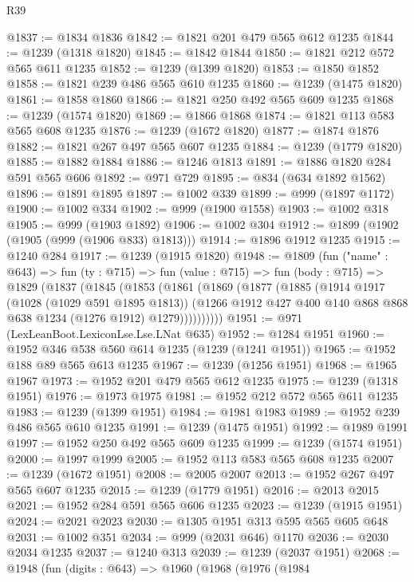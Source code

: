 \begin{lexlean}{R39}
\begin{coremodule}
@1837 := @1834 @1836
@1842 := @1821 @201 @479 @565 @612 @1235
@1844 := @1239 (@1318 @1820)
@1845 := @1842 @1844
@1850 := @1821 @212 @572 @565 @611 @1235
@1852 := @1239 (@1399 @1820)
@1853 := @1850 @1852
@1858 := @1821 @239 @486 @565 @610 @1235
@1860 := @1239 (@1475 @1820)
@1861 := @1858 @1860
@1866 := @1821 @250 @492 @565 @609 @1235
@1868 := @1239 (@1574 @1820)
@1869 := @1866 @1868
@1874 := @1821 @113 @583 @565 @608 @1235
@1876 := @1239 (@1672 @1820)
@1877 := @1874 @1876
@1882 := @1821 @267 @497 @565 @607 @1235
@1884 := @1239 (@1779 @1820)
@1885 := @1882 @1884
@1886 := @1246 @1813
@1891 := @1886 @1820 @284 @591 @565 @606
@1892 := @971 @729
@1895 := @834 (@634 @1892 @1562)
@1896 := @1891 @1895
@1897 := @1002 @339
@1899 := @999 (@1897 @1172)
@1900 := @1002 @334
@1902 := @999 (@1900 @1558)
@1903 := @1002 @318
@1905 := @999 (@1903 @1892)
@1906 := @1002 @304
@1912 := @1899 (@1902 (@1905 (@999 (@1906 @833) @1813)))
@1914 := @1896 @1912 @1235
@1915 := @1240 @284
@1917 := @1239 (@1915 @1820)
@1948 := @1809
    (fun ("name" : @643) =>
    fun (ty : @715) =>
    fun (value : @715) =>
    fun (body : @715) =>
    @1829
      (@1837
        (@1845
          (@1853
            (@1861
              (@1869
                (@1877
                  (@1885
                    (@1914
                      @1917
                      (@1028 (@1029 @591 @1895 @1813))
                      (@1266 @1912 @427 @400 @140 @868 @868 @638 @1234 (@1276 @1912) @1279))))))))))
@1951 := @971 (LexLeanBoot.LexiconLse.Lse.LNat @635)
@1952 := @1284 @1951
@1960 := @1952 @346 @538 @560 @614 @1235 (@1239 (@1241 @1951))
@1965 := @1952 @188 @89 @565 @613 @1235
@1967 := @1239 (@1256 @1951)
@1968 := @1965 @1967
@1973 := @1952 @201 @479 @565 @612 @1235
@1975 := @1239 (@1318 @1951)
@1976 := @1973 @1975
@1981 := @1952 @212 @572 @565 @611 @1235
@1983 := @1239 (@1399 @1951)
@1984 := @1981 @1983
@1989 := @1952 @239 @486 @565 @610 @1235
@1991 := @1239 (@1475 @1951)
@1992 := @1989 @1991
@1997 := @1952 @250 @492 @565 @609 @1235
@1999 := @1239 (@1574 @1951)
@2000 := @1997 @1999
@2005 := @1952 @113 @583 @565 @608 @1235
@2007 := @1239 (@1672 @1951)
@2008 := @2005 @2007
@2013 := @1952 @267 @497 @565 @607 @1235
@2015 := @1239 (@1779 @1951)
@2016 := @2013 @2015
@2021 := @1952 @284 @591 @565 @606 @1235
@2023 := @1239 (@1915 @1951)
@2024 := @2021 @2023
@2030 := @1305 @1951 @313 @595 @565 @605 @648
@2031 := @1002 @351
@2034 := @999 (@2031 @646) @1170
@2036 := @2030 @2034 @1235
@2037 := @1240 @313
@2039 := @1239 (@2037 @1951)
@2068 := @1948
    (fun (digits : @643) =>
    @1960
      (@1968
        (@1976
          (@1984

\end{coremodule}
\end{lexlean}
